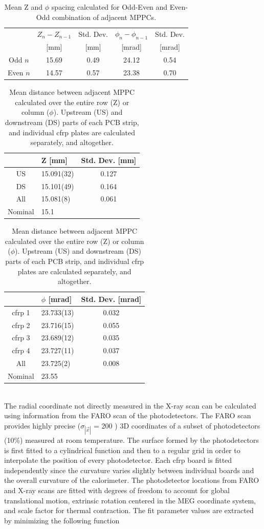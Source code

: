 \begin{table}
\begin{tabular}{ccccc}
 & $Z_{n} - Z_{n-1}$ &Std. Dev.& $\phi_{n} - \phi_{n-1}$ & Std. Dev. \\
 & [mm] &[mm]& [mrad]& [mrad]\\
\hline
Odd  $n$ & 15.69 & 0.49 & 24.12 & 0.54 \\ 
Even $n$ & 14.57 & 0.57 & 23.38 & 0.70 \\ 
\end{tabular}
\caption{Mean Z and $\phi$ spacing calculated for Odd-Even and Even-Odd
combination  of adjacent MPPCs.}
\label{tab:oddeven}
\end{table}

\begin{table}
\begin{tabular}{clc}
   & Z [mm] &Std. Dev. [mm] \\
\hline
US     & 15.091(32)& 0.127  \\
DS     & 15.101(49)& 0.164  \\
All    & 15.081(8) & 0.061  \\
Nominal& 15.1      &
\end{tabular}

\begin{tabular}{clc}
   & $\phi$ [mrad] &Std. Dev. [mrad] \\
\hline
cfrp 1     & 23.733(13)& 0.032  \\
cfrp 2     & 23.716(15)& 0.055  \\
cfrp 3     & 23.689(12)& 0.035  \\
cfrp 4     & 23.727(11)& 0.037  \\
All        & 23.725(2) & 0.008  \\
Nominal    & 23.55 &     
\end{tabular}
\label{tab:avgspacing}
\caption{Mean distance between adjacent MPPC calculated over the entire row (Z) or 
column ($\phi$). Upstream (US) and downstream (DS) parts of each PCB strip, and
individual cfrp plates are calculated separately, and altogether.}
\end{table}


\\
The radial coordinate not directly measured in the X-ray scan can be
calculated using information from the FARO scan of the photodetectors.
The FARO scan provides highly precise ($\sigma_{|\vec{x}|}$ = 200
\micron) 3D coordinates of a subset of photodetectors (10\%) measured
at room temperature.  The surface formed by the photodetectors is
first fitted to a cylindrical function and then to a regular grid in
order to interpolate the position of every  photodetector.  Each cfrp
board is fitted independently since the curvature varies slightly
between individual boards and the overall curvature of the
calorimeter.  The photodetector locations from FARO and X-ray scans
are fitted with degrees of freedom to account
for global translational motion, extrinsic rotation centered in the
MEG coordinate  system, and scale factor for thermal contraction. The
fit parameter values are extracted by minimizing the following
function

